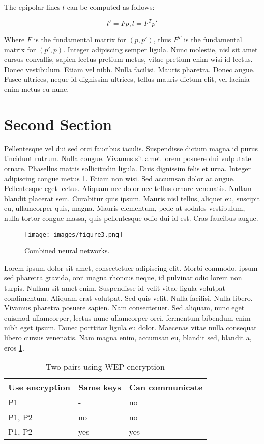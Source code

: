 The epipolar lines $l$ can be computed as follows:

\[l'=Fp, l=F^{T}p'\]

Where $F$ is the fundamental matrix for $(p, p')$, thus $F^{T}$ is the fundamental matrix for $(p',p)$. Integer adipiscing semper ligula. Nunc molestie, nisl sit amet cursus convallis, sapien lectus pretium metus, vitae pretium enim wisi id lectus. Donec vestibulum. Etiam vel nibh. Nulla facilisi. Mauris pharetra. Donec augue. Fusce ultrices, neque id dignissim ultrices, tellus mauris dictum elit, vel lacinia enim metus eu nunc.

\section{Second Section}
Pellentesque vel dui sed orci faucibus iaculis. Suspendisse dictum magna id purus tincidunt rutrum. Nulla congue. Vivamus sit amet lorem posuere dui vulputate ornare. Phasellus mattis sollicitudin ligula. Duis dignissim felis et urna. Integer adipiscing congue metus \ref{fig:combinedneuralnetworks}. Etiam non wisi. Sed accumsan dolor ac augue. Pellentesque eget lectus. Aliquam nec dolor nec tellus ornare venenatis. Nullam blandit placerat sem. Curabitur quis ipsum. Mauris nisl tellus, aliquet eu, suscipit eu, ullamcorper quis, magna. Mauris elementum, pede at sodales vestibulum, nulla tortor congue massa, quis pellentesque odio dui id est. Cras faucibus augue.

\begin{figure}[H]
    \centering
    \texttt{[image: images/figure3.png]}
    \caption{Combined neural networks.}\label{fig:combinedneuralnetworks}
\end{figure}

Lorem ipsum dolor sit amet, consectetuer adipiscing elit. Morbi commodo, ipsum sed pharetra gravida, orci magna rhoncus neque, id pulvinar odio lorem non turpis. Nullam sit amet enim. Suspendisse id velit vitae ligula volutpat condimentum. Aliquam erat volutpat. Sed quis velit. Nulla facilisi. Nulla libero. Vivamus pharetra posuere sapien. Nam consectetuer. Sed aliquam, nunc eget euismod ullamcorper, lectus nunc ullamcorper orci, fermentum bibendum enim nibh eget ipsum. Donec porttitor ligula eu dolor. Maecenas vitae nulla consequat libero cursus venenatis. Nam magna enim, accumsan eu, blandit sed, blandit a, eros \ref{tab:results}.

\begin{table}[ht]
	\centering
	\begin{tabular}{ | l | l | l |} \hline
		\textbf{Use encryption} & \textbf{Same keys} & \textbf{Can communicate} \\ \hline
		P1 & - & no \\ \hline
		P1, P2 & no & no \\ \hline
		P1, P2 & yes & yes \\ \hline
	\end{tabular}
	\caption{Two pairs using WEP encryption}
	\label{tab:results}
\end{table}

